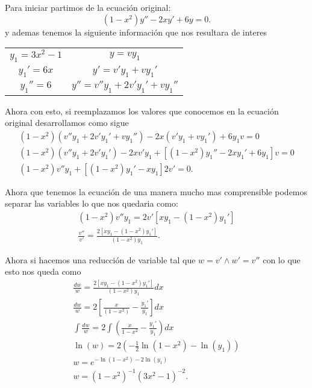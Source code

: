 \begin{enumerate}
	Para iniciar partimos de la ecuación original: \[
	  (1-x^2)y''-2xy'+6y=0
	.\] y ademas tenemos la siguiente información que nos resultara de interes
	\begin{table}[htpb]
	  \centering
	  \begin{tabular}{|c|c|}
	    \hline
	    $y_1 = 3x^2-1$ & $y = vy_1$ \\
	    $y_1' = 6x$ & $y' = v'y_1 + vy_1'$\\
	    $y_1'' = 6$ & $y'' = v''y_1 + 2v'y_1' + vy_1''$\\
	    \hline
	  \end{tabular}
	\end{table}

	Ahora con esto, si reemplazamos los valores que conocemos en la ecuación original desarrollamos como sigue
	\begin{align*}
	  \left( 1-x^2 \right) \left( v''y_1+2v'y_1'+vy_1'' \right) -2x\left( v'y_1 + vy_1' \right) + 6y_1v = 0 \\
	  \left( 1-x^2 \right) \left( v''y_1 + 2v'y_1' \right) - 2xv'y_1 + \left[ \left( 1-x^2 \right) y_1'' - 2xy_1' + 6y_1 \right]v = 0\\
	  \left( 1-x^2 \right) v''y_1 + \left[ \left( 1-x^2 \right) y_1' - xy_1\right]2v' = 0 
	.\end{align*}

	Ahora que tenemos la ecuación de una manera mucho mas comprensible podemos separar las variables lo que nos quedaria como:
	\begin{align*}
	  \left( 1-x^2 \right) v''y_1 = 2v'\left[ xy_1 - \left( 1-x^2 \right) y_1' \right] \\
	  \frac{v''}{v'} = \frac{2\left[ xy_1 - \left( 1-x^2 \right) y_1'\right] }{\left( 1-x^2 \right) y_1}
	.\end{align*}

	Ahora si hacemos una reducción de variable tal que $w = v' \land w'=v''$ con lo que esto nos queda como
	\begin{align*}
	  \frac{dw}{w} = \frac{2\left[ xy_1 - \left( 1-x^2 \right) y_1'\right] }{\left( 1-x^2 \right) y_1} dx\\
	  \frac{dw}{w} = 2\left[ \frac{x}{\left( 1-x^2 \right) } - \frac{y_1'}{y_1} \right]dx\\
	  \int \frac{dw}{w} = 2\int \left(\frac{x}{1-x^2} - \frac{y_1'}{y_1}\right)dx\\
	  \ln\left( w \right) = 2 \left( -\frac{1}{2}\ln\left( 1-x^2 \right) - \ln\left( y_1 \right)  \right)\\
	  w = e^{-\ln\left( 1-x^2 \right) - 2\ln\left( y_1 \right) }\\
	  w = \left( 1-x^2 \right)^{-1} \left( 3x^2-1 \right)^{-2}
	.\end{align*}


\end{enumerate}
